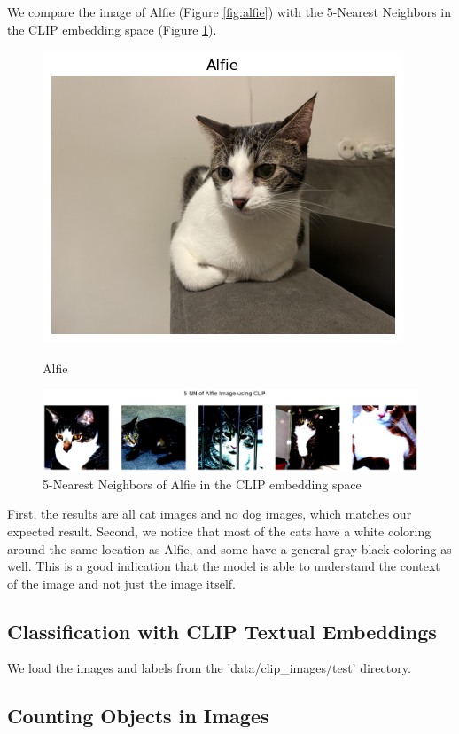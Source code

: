 \documentclass{article}
\begin{document}
We compare the image of Alfie (Figure \ref{fig:alfie}) with the 5-Nearest Neighbors in the CLIP embedding space (Figure \ref{fig:alfie_nn}). 

\begin{figure}[h!]
    \centering
    \begin{minipage}[b]{0.15\textwidth}
        \centering
        \includegraphics[width=\textwidth]{figs/3.2_alfie.png}
        \caption{Alfie}
        \label{fig:alfie}
    \end{minipage}
    \hfill
    \begin{minipage}[b]{0.75\textwidth}
        \centering
        \includegraphics[width=\textwidth]{figs/3.2_5nn.png}
        \caption{5-Nearest Neighbors of Alfie in the CLIP embedding space}
        \label{fig:alfie_nn}
    \end{minipage}
\end{figure}

First, the results are all cat images and no dog images, which matches our expected result. Second, we notice that most of the cats have a white coloring around the same location as Alfie, and some have a general gray-black coloring as well. This is a good indication that the model is able to understand the context of the image and not just the image itself.

\subsection{Classification with CLIP Textual Embeddings}
We load the images and labels from the 'data/clip\_images/test' directory.

\subsection{Counting Objects in Images}
\end{document}
